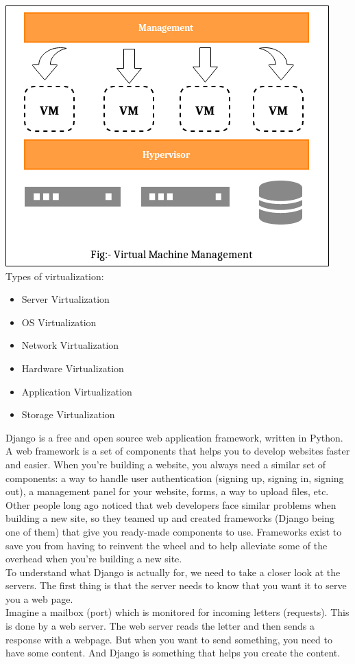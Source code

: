 \documentclass[a4paper,12pt]{report}
\begin{document}
\includegraphics[scale=.85]{vm_management}\\

Types of virtualization:
\begin{itemize}
	\item Server Virtualization
	\item OS Virtualization
	\item Network Virtualization
	\item Hardware Virtualization
	\item Application Virtualization
	\item Storage Virtualization\\
\end{itemize}
Django is a free and open source web application framework, written in Python. A web framework is a set of components that helps you to develop websites faster and easier.
When you're building a website, you always need a similar set of components: a way to handle user authentication (signing up, signing in, signing out), a management panel for your website, forms, a way to upload files, etc. \\
\newline
Other people long ago noticed that web developers face similar problems when building a new site, so they teamed up and created frameworks (Django being one of them) that give you ready-made components to use.
Frameworks exist to save you from having to reinvent the wheel and to help alleviate some of the overhead when you’re building a new site. \\
\newline
To understand what Django is actually for, we need to take a closer look at the servers. The first thing is that the server needs to know that you want it to serve you a web page.\\
\newline
Imagine a mailbox (port) which is monitored for incoming letters (requests). This is done by a web server. The web server reads the letter and then sends a response with a webpage. But when you want to send something, you need to have some content. And Django is something that helps you create the content.
\end{document}
